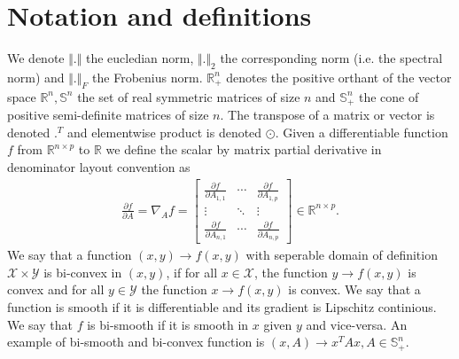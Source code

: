 \documentclass[letterpaper,10pt,english]{sphinxmanual}
\begin{document}
\section{Notation and definitions}
\label{\detokenize{sections/introduction:notation-and-definitions}}
We denote \(\Vert . \Vert\) the eucledian norm, \(\Vert . \Vert_2\) the corresponding norm (i.e. the spectral norm) and
\(\Vert . \Vert_F\) the Frobenius norm. \(\mathbb{R}_+^n\) denotes the positive orthant of the vector space \(\mathbb{R}^n, \mathbb{S}^n\)
the set of real symmetric matrices of size \(n\) and \(\mathbb{S}_+^n\) the cone of positive semi-definite matrices of size \(n\). The transpose of a matrix or
vector is denoted \(.^T\) and elementwise product is denoted \(\odot\). Given a differentiable function \(f\) from \(\mathbb{R}^{n \times p}\) to \(\mathbb{R}\)
we define the scalar by matrix partial derivative in denominator layout convention as
\begin{equation*}
\begin{split}\frac{\partial f}{\partial A} = \nabla_A f = \begin{bmatrix}
        \frac{\partial f}{\partial A_{1,1}} & \cdots & \frac{\partial f}{\partial A_{1,p}} \\
        \vdots & \ddots & \vdots \\
        \frac{\partial f}{\partial A_{n,1}} & \cdots & \frac{\partial f}{\partial A_{n,p}}
    \end{bmatrix}
    \in \mathbb{R}^{n \times p}.\end{split}
\end{equation*}
We say that a function \((x,y) \rightarrow f(x,y)\) with seperable domain of definition \(\mathcal{X} \times \mathcal{Y}\) is bi-convex in \((x,y)\),
if for all \(x \in \mathcal{X}\), the function \(y \rightarrow f(x,y)\) is convex and for all \(y \in \mathcal{Y}\) the function \(x \rightarrow f(x,y)\) is convex.
We say that a function is smooth if it is differentiable and its gradient is Lipschitz continious. We say that \(f\) is bi-smooth if it is smooth in \(x\) given \(y\) and
vice-versa. An example of bi-smooth and bi-convex function is \((x,A) \rightarrow x^TAx, A \in \mathbb{S}_+^n\).
\end{document}
